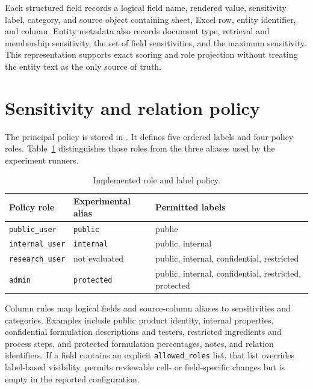 Each structured field records a logical field name, rendered value, sensitivity label, category, and source object containing sheet, Excel row, entity identifier, and column. Entity metadata also records document type, retrieval and membership sensitivity, the set of field sensitivities, and the maximum sensitivity. This representation supports exact scoring and role projection without treating the entity text as the only source of truth.

\section{Sensitivity and relation policy}
\label{sec:architecture-policy}

The principal policy is stored in . It defines five ordered labels and four policy roles. Table~\ref{tab:architecture-role-policy} distinguishes those roles from the three aliases used by the experiment runners.

\begin{table}[htbp]
\centering
\caption{Implemented role and label policy.}
\label{tab:architecture-role-policy}
\begin{tabularx}{\textwidth}{@{}l l X@{}}
\toprule
Policy role & Experimental alias & Permitted labels \\
\midrule
\texttt{public\_user} & \texttt{public} & public \\
\texttt{internal\_user} & \texttt{internal} & public, internal \\
\texttt{research\_user} & not evaluated & public, internal, confidential, restricted \\
\texttt{admin} & \texttt{protected} & public, internal, confidential, restricted, protected \\
\bottomrule
\end{tabularx}
\end{table}

Column rules map logical fields and source-column aliases to sensitivities and categories. Examples include public product identity, internal properties, confidential formulation descriptions and testers, restricted ingredients and process steps, and protected formulation percentages, notes, and relation identifiers. If a field contains an explicit \texttt{allowed\_roles} list, that list overrides label-based visibility.  permits reviewable cell- or field-specific changes but is empty in the reported configuration.

